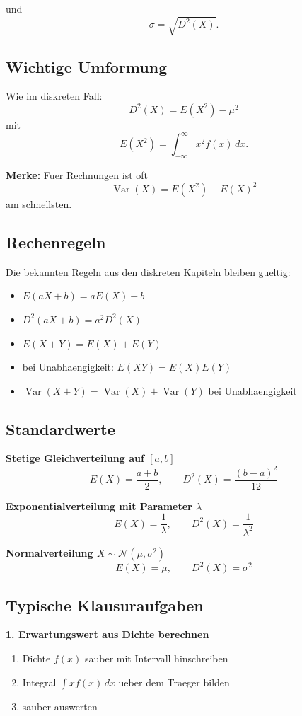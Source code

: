 \documentclass[a4paper,11pt]{article}
\begin{document}
und
\[
\sigma=\sqrt{D^2(X)}.
\]

\subsection{Wichtige Umformung}
Wie im diskreten Fall:
\[
D^2(X)=E(X^2)-\mu^2
\]
mit
\[
E(X^2)=\int_{-\infty}^{\infty} x^2 f(x)\,dx.
\]

\textbf{Merke:}
Fuer Rechnungen ist oft
\[
\operatorname{Var}(X)=E(X^2)-E(X)^2
\]
am schnellsten.

\subsection{Rechenregeln}
Die bekannten Regeln aus den diskreten Kapiteln bleiben gueltig:
\begin{itemize}
  \item $E(aX+b)=aE(X)+b$
  \item $D^2(aX+b)=a^2D^2(X)$
  \item $E(X+Y)=E(X)+E(Y)$
  \item bei Unabhaengigkeit: $E(XY)=E(X)E(Y)$
  \item $\operatorname{Var}(X+Y)=\operatorname{Var}(X)+\operatorname{Var}(Y)$ bei Unabhaengigkeit
\end{itemize}

\subsection{Standardwerte}
\textbf{Stetige Gleichverteilung auf $[a,b]$}
\[
E(X)=\frac{a+b}{2},\qquad D^2(X)=\frac{(b-a)^2}{12}
\]

\textbf{Exponentialverteilung mit Parameter $\lambda$}
\[
E(X)=\frac1\lambda,\qquad D^2(X)=\frac1{\lambda^2}
\]

\textbf{Normalverteilung $X\sim \mathcal N(\mu,\sigma^2)$}
\[
E(X)=\mu,\qquad D^2(X)=\sigma^2
\]

\subsection{Typische Klausuraufgaben}
\textbf{1. Erwartungswert aus Dichte berechnen}
\begin{enumerate}
  \item Dichte $f(x)$ sauber mit Intervall hinschreiben
  \item Integral $\int x f(x)\,dx$ ueber dem Traeger bilden
  \item sauber auswerten
\end{enumerate}
\end{document}
